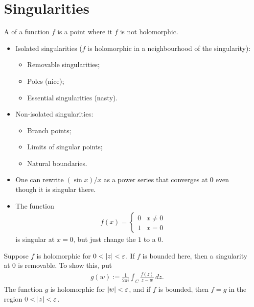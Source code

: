 \documentclass[11pt, oneside,margin=1in]{article}
\begin{document}
\section{Singularities}
A  of a function $f$ is a point where it $f$ is not holomorphic.
\begin{itemize}
	\item Isolated singularities ($f$ is holomorphic in a neighbourhood of the singularity):
		\begin{itemize}
			\item Removable singularities;
			\item Poles (nice);
			\item Essential singularities (nasty).
		\end{itemize}
	\item Non-isolated singularities:
		\begin{itemize}
			\item Branch points;
			\item Limits of singular points;
			\item Natural boundaries.
		\end{itemize}
\end{itemize}

\begin{example}\label{}\text{}
\begin{itemize}
	\item One can rewrite $(\sin x)/x$ as a power series that converges at $0$ even though it is singular there.
	\item The function
		\begin{align*}
			f(x) = \begin{cases}
				0 &x\ne 0\\
				1 & x=0
			\end{cases}
		\end{align*}
		is singular at $x=0$, but just change the $1$ to a $0$.
\end{itemize}
Suppose $f$ is holomorphic for $0<\left \lvert z \right \rvert <\varepsilon$. If $f$ is bounded here, then a singularity at $0$ is removable. To show this, put
\begin{align*}
	g(w) := \frac{1}{2\pi i} \int_C \frac{f (z)}{z-w} \, dz.
\end{align*}
The function $g$ is holomorphic for $\left \lvert w \right \rvert < \varepsilon$, and if $f$ is bounded, then $f=g$ in the region $0<\left \lvert z \right \rvert <\varepsilon$.
\end{example}
\end{document}
